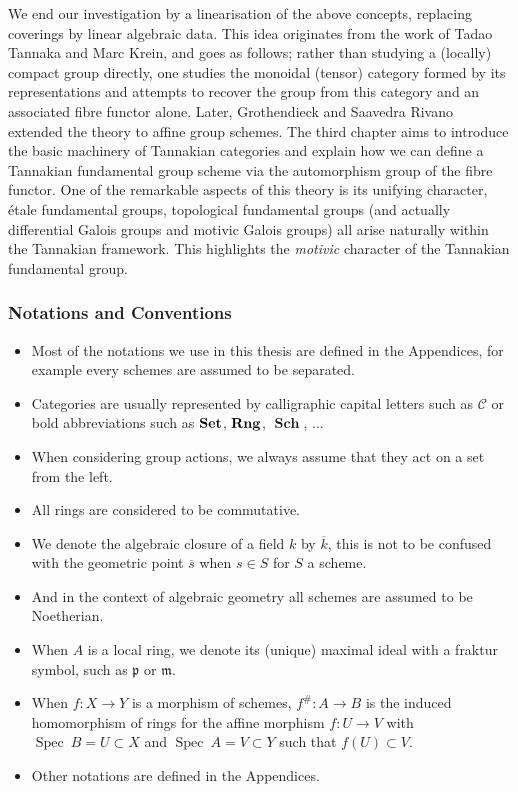 \documentclass{article}
\theoremstyle{plain}
\theoremstyle{definition}
\DeclareMathOperator{\Spec}{Spec}
\DeclareMathOperator{\Sch}{\textbf{Sch}}
\DeclareMathOperator{\SET}{\bf{Set}}
\DeclareMathOperator{\Rng}{\bf{Rng}}
\begin{document}
We end our investigation by a linearisation of the above concepts, replacing coverings by linear algebraic data. 
This idea originates from the work of Tadao Tannaka and Marc Krein, and goes as follows; 
rather than studying a (locally) compact group directly, one studies the monoidal (tensor) category formed by its representations and attempts to recover the group from this category and an associated fibre functor alone.
Later, Grothendieck and Saavedra Rivano extended the theory to affine group schemes. 
The third chapter aims to introduce the basic machinery of Tannakian categories and explain how we can define a Tannakian
fundamental group scheme via the automorphism group of the fibre functor. 
One of the remarkable aspects of this theory is its unifying character, \'etale fundamental groups, topological fundamental groups (and actually differential Galois groups and motivic Galois groups) all arise naturally within the Tannakian framework. 
This highlights the \textit{motivic} character of the Tannakian fundamental group.



\subsubsection*{Notations and Conventions}

\begin{itemize}
    \item[] Most of the notations we use in this thesis are defined in the Appendices, for example every schemes are assumed to be separated.
    \item[] Categories are usually represented by calligraphic capital letters such as $\mathcal{C}$ or bold abbreviations such as $\SET$, $\Rng$, $\Sch$, $\dots$
    \item[] When considering group actions, we always assume that they act on a set from the left.
    \item[] All rings are considered to be commutative.
    \item[] We denote the algebraic closure of a field $k$ by $\overline{k}$, this is not to be confused with the geometric point $\overline{s}$ when $s\in S$ for $S$ a scheme.
    \item[] And in the context of algebraic geometry all schemes are assumed to be Noetherian.
    \item[] When $A$ is a local ring, we denote its (unique) maximal ideal with a fraktur symbol, such as $\mathfrak{p}$ or $\mathfrak{m}$.
    \item[] When $f:X\rightarrow Y$ is a morphism of schemes, $f^{\#}: A \rightarrow B$ is the induced homomorphism of rings for the affine morphism $f:U\rightarrow V$ with $\Spec\: B = U\subset X$ and $\Spec\:A = V\subset Y$ such that $f(U)\subset V$.
    \item[] Other notations are defined in the Appendices.
\end{itemize}
\end{document}
